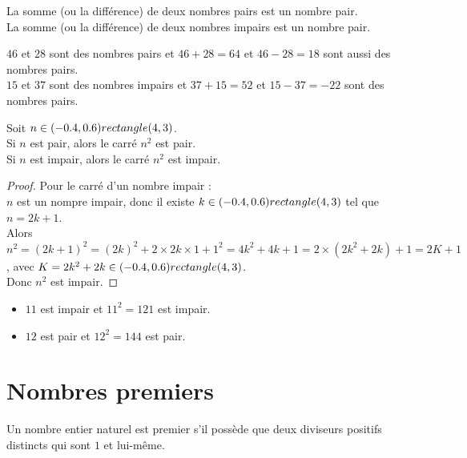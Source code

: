 \begin{Propriété}
La somme (ou la différence) de deux nombres pairs est un nombre pair.\\
La somme (ou la différence) de deux nombres impairs est un nombre pair.
\end{Propriété}

\begin{Exemple}
$46$ et $28$ sont des nombres pairs et $46+28=64$ et $46-28=18$ sont aussi des nombres pairs.\\
$15$ et $37$ sont des nombres impairs et $37+15=52$ et $15-37=-22$ sont des nombres pairs.
\end{Exemple}

\begin{Propriété}
Soit $n\in (-0.4,0.6) rectangle (4,3)$. \\
Si $n$ est pair, alors le carré $n^2$ est pair.\\
Si $n$ est impair, alors le carré $n^2$ est impair.
\end{Propriété}

\begin{proof}
Pour le carré d'un nombre impair :\\
$n$ est un nompre impair, donc il existe $k\in (-0.4,0.6) rectangle (4,3)$ tel que $n=2k+1$. \\Alors $n^2=(2k+1)^2=(2k)^2+2\times 2k\times 1 +1^2=4k^2+4k+1=2\times (2k^2+2k)+1=2K+1$, avec $K=2k^2+2k \in (-0.4,0.6) rectangle (4,3)$. \\Donc $n^2$ est impair.
\end{proof}

\begin{Exemple}
\leavevmode\vspace{-\baselineskip}
\begin{itemize}[label=\textcolor{Couleur8}{$\bullet$}]
\item $11$ est impair et $11^2=121$ est impair.
\item $12$ est pair et $12^2=144$ est pair.
\end{itemize}
\end{Exemple}



\section{Nombres premiers}

\begin{Définition}
Un nombre entier naturel est premier s'il possède que deux diviseurs positifs distincts qui sont $1$ et lui-même.
\end{Définition}

